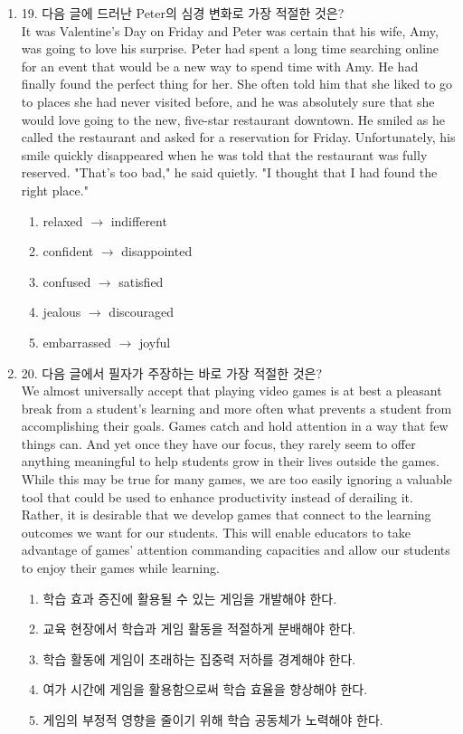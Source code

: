 \documentclass{article}
\begin{document}
\begin{enumerate}[label=\textbf{Q\arabic*.}]
\item
19. 다음 글에 드러난 Peter의 심경 변화로 가장 적절한 것은?
\\
It was Valentine's Day on Friday and Peter was certain that his wife, Amy, was going to love his surprise. Peter had spent a long time searching online for an event that would be a new way to spend time with Amy. He had finally found the perfect thing for her. She often told him that she liked to go to places she had never visited before, and he was absolutely sure that she would love going to the new, five-star restaurant downtown. He smiled as he called the restaurant and asked for a reservation for Friday. Unfortunately, his smile quickly disappeared when he was told that the restaurant was fully reserved. "That's too bad," he said quietly. "I thought that I had found the right place."

\begin{enumerate}
  \item relaxed $\to$ indifferent
  \item confident $\to$ disappointed
  \item confused $\to$ satisfied
  \item jealous $\to$ discouraged
  \item embarrassed $\to$ joyful
\end{enumerate}

\item
20. 다음 글에서 필자가 주장하는 바로 가장 적절한 것은?
\\
We almost universally accept that playing video games is at best a pleasant break from a student's learning and more often what prevents a student from accomplishing their goals. Games catch and hold attention in a way that few things can. And yet once they have our focus, they rarely seem to offer anything meaningful to help students grow in their lives outside the games. While this may be true for many games, we are too easily ignoring a valuable tool that could be used to enhance productivity instead of derailing it. Rather, it is desirable that we develop games that connect to the learning outcomes we want for our students. This will enable educators to take advantage of games' attention commanding capacities and allow our students to enjoy their games while learning.

\begin{enumerate}
  \item 학습 효과 증진에 활용될 수 있는 게임을 개발해야 한다.
  \item 교육 현장에서 학습과 게임 활동을 적절하게 분배해야 한다.
  \item 학습 활동에 게임이 초래하는 집중력 저하를 경계해야 한다.
  \item 여가 시간에 게임을 활용함으로써 학습 효율을 향상해야 한다.
  \item 게임의 부정적 영향을 줄이기 위해 학습 공동체가 노력해야 한다.
\end{enumerate}


\end{enumerate}
\end{document}

